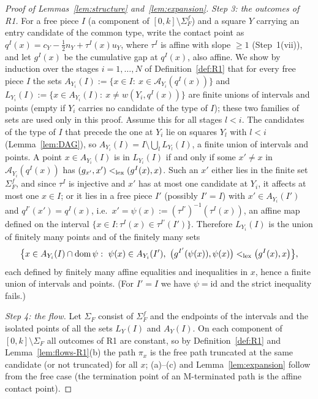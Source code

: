 \documentclass[11pt]{amsart}
\theoremstyle{definition}
\theoremstyle{remark}
\numberwithin{equation}{section}
\begin{document}
\begin{proof}[Proof of Lemmas~\ref{lem:structure} and~\ref{lem:expansion}]
\emph{Step 3: the outcomes of R1.} For a free piece $I$ (a component of $[0,k]\setminus\Sigma^f_F$) and a square $Y$
carrying an entry candidate of the common type, write the contact point as $q^I(x)=c_Y-\frac12n_Y+\tau^I(x)u_Y$, where
$\tau^I$ is affine with slope $\ge1$ (Step~1(vii)), and let $g^I(x)$ be the cumulative gap at $q^I(x)$, also affine.
We show by induction over the stages $i=1,\dots,N$ of Definition~\ref{def:R1} that for every free piece $I$ the sets
$A_{Y_i}(I):=\{x\in I:\ x\in\mathcal A_{Y_i}(q^I(x))\}$ and $L_{Y_i}(I):=\{x\in A_{Y_i}(I):\ x\ne w(Y_i,q^I(x))\}$ are finite
unions of intervals and points (empty if $Y_i$ carries no candidate of the type of $I$); these two families of sets
are used only in this proof. Assume this for all stages
$l<i$. The candidates of the type of $I$ that precede the one at $Y_i$ lie on squares $Y_l$ with $l<i$
(Lemma~\ref{lem:DAG}), so $A_{Y_i}(I)=I\setminus\bigcup_lL_{Y_l}(I)$, a finite union of intervals and points. A point
$x\in A_{Y_i}(I)$ is in $L_{Y_i}(I)$ if and only if some $x'\ne x$ in $\mathcal A_{Y_i}(q^I(x))$ has
$(g_{x'},x')<_{\rm lex}(g^I(x),x)$. Such an $x'$ either lies in the finite set $\Sigma^f_F$, and since $\tau^I$ is
injective and $x'$ has at most one candidate at $Y_i$, it affects at most one $x\in I$; or it lies in a free piece $I'$
(possibly $I'=I$) with $x'\in A_{Y_i}(I')$ and $q^{I'}(x')=q^I(x)$, i.e.\ $x'=\psi(x):=(\tau^{I'})^{-1}(\tau^I(x))$, an
affine map defined on the interval $\{x\in I:\tau^I(x)\in\tau^{I'}(I')\}$. Therefore $L_{Y_i}(I)$ is the union of
finitely many points and of the finitely many sets
\[
\big\{x\in A_{Y_i}(I)\cap\operatorname{dom}\psi:\ \psi(x)\in A_{Y_i}(I'),\ \big(g^{I'}(\psi(x)),\psi(x)\big)<_{\rm lex}\big(g^I(x),x\big)\big\},
\]
each defined by finitely many affine equalities and inequalities in $x$, hence a finite union of intervals and points.
(For $I'=I$ we have $\psi=\mathrm{id}$ and the strict inequality fails.)

\emph{Step 4: the flow.} Let $\Sigma_F$ consist of $\Sigma^f_F$ and the endpoints of the intervals and the isolated
points of all the sets $L_Y(I)$ and $A_Y(I)$. On each component of $[0,k]\setminus\Sigma_F$ all outcomes of R1 are constant, so by
Definition~\ref{def:R1} and Lemma~\ref{lem:flows-R1}(b) the path $\pi_x$ is the free path truncated at the same
candidate (or not truncated) for all $x$; (a)--(c) and Lemma~\ref{lem:expansion} follow from the free case (the
termination point of an M-terminated path is the affine contact point).
\end{proof}
\end{document}
